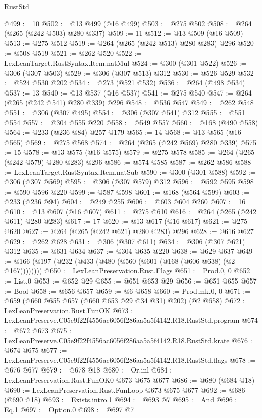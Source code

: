 \begin{lexlean}{RustStd}
\begin{coremodule}
@499 := 10
@502 := @13 @499 (@16 @499)
@503 := @275 @502
@508 := @264 (@265 (@242 @503) @280 @337)
@509 := 11
@512 := @13 @509 (@16 @509)
@513 := @275 @512
@519 := @264 (@265 (@242 @513) @280 @283) @296
@520 := @508 @519
@521 := @262 @520
@522 := LexLeanTarget.RustSyntax.Item.natMul
@524 := @300 (@301 @522)
@526 := @306 (@307 @503)
@529 := @306 (@307 @513) @312
@530 := @526 @529
@532 := @524 @530 @202
@534 := @273 (@521 @532)
@536 := @264 (@498 @534)
@537 := 13
@540 := @13 @537 (@16 @537)
@541 := @275 @540
@547 := @264 (@265 (@242 @541) @280 @339) @296
@548 := @536 @547
@549 := @262 @548
@551 := @306 (@307 @495)
@554 := @306 (@307 @541) @312
@555 := @551 @554
@557 := @304 @555 @220
@558 := @549 @557
@560 := @168 (@490 @558)
@564 := @233 (@236 @84) @257 @179
@565 := 14
@568 := @13 @565 (@16 @565)
@569 := @275 @568
@574 := @264 (@265 (@242 @569) @280 @339)
@575 := 15
@578 := @13 @575 (@16 @575)
@579 := @275 @578
@585 := @264 (@265 (@242 @579) @280 @283) @296
@586 := @574 @585
@587 := @262 @586
@588 := LexLeanTarget.RustSyntax.Item.natSub
@590 := @300 (@301 @588)
@592 := @306 (@307 @569)
@595 := @306 (@307 @579) @312
@596 := @592 @595
@598 := @590 @596 @220
@599 := @587 @598
@601 := @168 (@564 @599)
@603 := @233 (@236 @94)
@604 := @249 @255
@606 := @603 @604 @260
@607 := 16
@610 := @13 @607 (@16 @607)
@611 := @275 @610
@616 := @264 (@265 (@242 @611) @280 @283)
@617 := 17
@620 := @13 @617 (@16 @617)
@621 := @275 @620
@627 := @264 (@265 (@242 @621) @280 @283) @296
@628 := @616 @627
@629 := @262 @628
@631 := @306 (@307 @611)
@634 := @306 (@307 @621) @312
@635 := @631 @634
@637 := @304 @635 @220
@638 := @629 @637
@649 := @166 (@197 (@232 (@433 (@480 (@560 (@601 (@168 (@606 @638) (@2 @167))))))))
@650 := LexLeanPreservation.Rust.Flags
@651 := Prod.{0, 0}
@652 := List.{0}
@653 := @652 @29
@655 := @651 @653 @29
@656 := @651 @655
@657 := Bool
@658 := @656 @657
@659 := @6 @658
@660 := Prod.mk.{0, 0}
@671 := @659 (@660 @655 @657 (@660 @653 @29 @34 @31) @202) (@2 @658)
@672 := LexLeanPreservation.Rust.FunOK
@673 := LexLeanPreserve.C05e9f22f4556ac6056f286aa5a5f4142.R18.RustStd.program
@674 := @672 @673
@675 := LexLeanPreserve.C05e9f22f4556ac6056f286aa5a5f4142.R18.RustStd.krate
@676 := @674 @675
@677 := LexLeanPreserve.C05e9f22f4556ac6056f286aa5a5f4142.R18.RustStd.flags
@678 := @676 @677
@679 := @678 @18
@680 := Or.inl
@684 := LexLeanPreservation.Rust.FunOK0 @673 @675 @677
@686 := @680 (@684 @18)
@690 := LexLeanPreservation.Rust.FunLoop @673 @675 @677
@692 := @686 (@690 @18)
@693 := Exists.intro.{1}
@694 := @693 @7
@695 := And
@696 := Eq.{1}
@697 := Option.{0}
@698 := @697 @7

\end{coremodule}
\end{lexlean}
